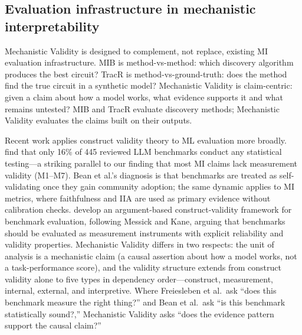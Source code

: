 \documentclass{article}
\begin{document}
\subsection{Evaluation infrastructure in mechanistic interpretability}
\label{sec:related-mi}

Mechanistic Validity is designed to complement, not replace, existing MI evaluation infrastructure. MIB \citep{mueller2025mib} is method-vs-method: which discovery algorithm produces the best circuit? TracR \citep{lindner2024interp} is method-vs-ground-truth: does the method find the true circuit in a synthetic model? Mechanistic Validity is claim-centric: given a claim about how a model works, what evidence supports it and what remains untested? MIB and TracR evaluate discovery methods; Mechanistic Validity evaluates the claims built on their outputs.

Recent work applies construct validity theory to ML evaluation more broadly. \citet{bean2025measuring} find that only 16\% of 445 reviewed LLM benchmarks conduct any statistical testing---a striking parallel to our finding that most MI claims lack measurement validity (M1--M7). Bean et al.'s diagnosis is that benchmarks are treated as self-validating once they gain community adoption; the same dynamic applies to MI metrics, where faithfulness and IIA are used as primary evidence without calibration checks. \citet{freiesleben2025benchmarking} develop an argument-based construct-validity framework for benchmark evaluation, following Messick and Kane, arguing that benchmarks should be evaluated as measurement instruments with explicit reliability and validity properties. Mechanistic Validity differs in two respects: the unit of analysis is a mechanistic claim (a causal assertion about how a model works, not a task-performance score), and the validity structure extends from construct validity alone to five types in dependency order---construct, measurement, internal, external, and interpretive. Where Freiesleben et al.\ ask ``does this benchmark measure the right thing?'' and Bean et al.\ ask ``is this benchmark statistically sound?,'' Mechanistic Validity asks ``does the evidence pattern support the causal claim?''
\end{document}

